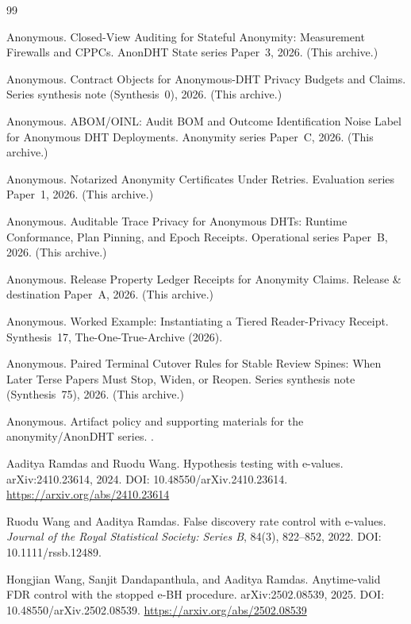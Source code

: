 \documentclass[11pt]{article}
\theoremstyle{definition}
\theoremstyle{remark}
\begin{document}
\begin{thebibliography}{99}

Anonymous.
\newblock Closed-View Auditing for Stateful Anonymity: Measurement Firewalls and CPPCs.
\newblock AnonDHT State series Paper~3, 2026. (This archive.)

Anonymous.
\newblock Contract Objects for Anonymous-DHT Privacy Budgets and Claims.
\newblock Series synthesis note (Synthesis~0), 2026. (This archive.)

Anonymous.
\newblock ABOM/OINL: Audit BOM and Outcome Identification Noise Label for Anonymous DHT Deployments.
\newblock Anonymity series Paper~C, 2026. (This archive.)

Anonymous.
\newblock Notarized Anonymity Certificates Under Retries.
\newblock Evaluation series Paper~1, 2026. (This archive.)

Anonymous.
\newblock Auditable Trace Privacy for Anonymous DHTs: Runtime Conformance, Plan Pinning, and Epoch Receipts.
\newblock Operational series Paper~B, 2026. (This archive.)

Anonymous.
\newblock Release Property Ledger Receipts for Anonymity Claims.
\newblock Release \& destination Paper~A, 2026. (This archive.)

Anonymous.
\newblock Worked Example: Instantiating a Tiered Reader-Privacy Receipt.
\newblock Synthesis~17, The-One-True-Archive (2026).

Anonymous.
\newblock Paired Terminal Cutover Rules for Stable Review Spines: When Later Terse Papers Must Stop, Widen, or Reopen.
\newblock Series synthesis note (Synthesis~75), 2026. (This archive.)

Anonymous.
\newblock Artifact policy and supporting materials for the anonymity/AnonDHT series.
.

Aaditya Ramdas and Ruodu Wang.
\newblock Hypothesis testing with e-values.
\newblock arXiv:2410.23614, 2024. DOI: 10.48550/arXiv.2410.23614.
\newblock \url{https://arxiv.org/abs/2410.23614}

Ruodu Wang and Aaditya Ramdas.
\newblock False discovery rate control with e-values.
\newblock \emph{Journal of the Royal Statistical Society: Series B}, 84(3), 822--852, 2022.
\newblock DOI: 10.1111/rssb.12489.

Hongjian Wang, Sanjit Dandapanthula, and Aaditya Ramdas.
\newblock Anytime-valid FDR control with the stopped e-BH procedure.
\newblock arXiv:2502.08539, 2025. DOI: 10.48550/arXiv.2502.08539.
\newblock \url{https://arxiv.org/abs/2502.08539}
\end{thebibliography}
\end{document}
